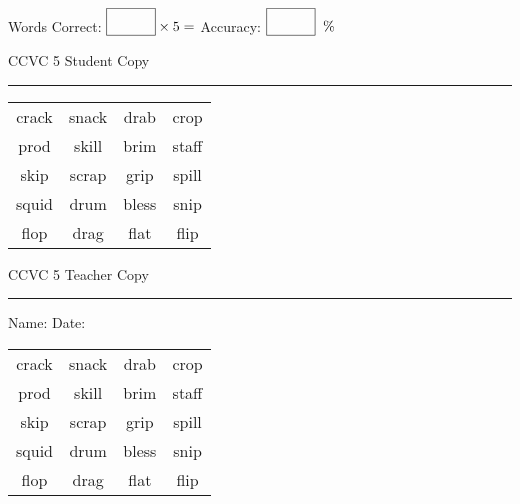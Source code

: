 \documentclass{memoir}
\begin{document}
\normalsize

Words Correct: $\fbox{\phantom{\huge 100}} \times 5 = $ Accuracy: $\fbox{\phantom{\huge 100}}\;\; \%$ 

\vfill

\newpage


\footnotesize \noindent
CCVC 5 \hfill Student Copy
\smallskip
\hrule

\Large

\setlength{\tabcolsep}{14pt}
\def\arraystretch{3}

{\selectfont


\begin{vplace}[0.5]
\begin{center}
\begin{tabular}{cccc}
crack       & snack & drab             & crop \\
prod & skill & brim      & staff            \\
skip & scrap & grip      & spill \\
squid & drum & bless & snip \\
flop & drag        & flat             & flip \\
\end{tabular}
\end{center}
\end{vplace}

}

\newpage

\footnotesize \noindent
CCVC 5 \hfill Teacher Copy
\smallskip
\hrule

\normalsize

\vfill

\noindent
Name: \underline{\hspace{1.75in}} \hfill Date: \underline{\hspace{1in}}

\Large

{\selectfont


\begin{vplace}[0.5]
\begin{center}
\begin{tabular}{cccc}
crack       & snack & drab             & crop \\
prod & skill & brim      & staff            \\
skip & scrap & grip      & spill \\
squid & drum & bless & snip \\
flop & drag        & flat             & flip \\
\end{tabular}
\end{center}
\end{vplace}



}
\end{document}
